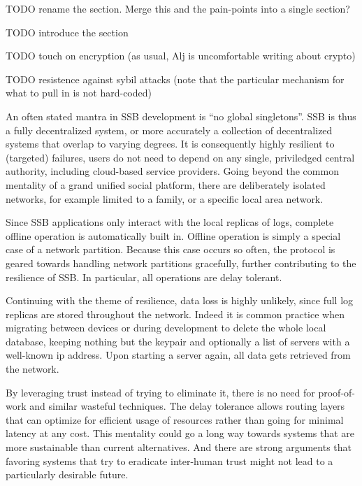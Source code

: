 \documentclass[sigconf]{acmart}
\begin{document}
TODO rename the section. Merge this and the pain-points into a single section?

TODO introduce the section

TODO touch on encryption (as usual, Alj is uncomfortable writing about crypto)

TODO resistence against sybil attacks (note that the particular mechanism for what to pull in is not hard-coded)

An often stated mantra in SSB development is ``no global singletons''. SSB is thus a fully decentralized system, or more accurately a collection of decentralized systems that overlap to varying degrees. It is consequently highly resilient to (targeted) failures, users do not need to depend on any single, priviledged central authority, including cloud-based service providers. Going beyond the common mentality of a grand unified social platform, there are deliberately isolated networks, for example limited to a family, or a specific local area network.

Since SSB applications only interact with the local replicas of logs, complete offline operation is automatically built in. Offline operation is simply a special case of a network partition. Because this case occurs so often, the protocol is geared towards handling network partitions gracefully, further contributing to the resilience of SSB. In particular, all operations are delay tolerant.

Continuing with the theme of resilience, data loss is highly unlikely, since full log replicas are stored throughout the network. Indeed it is common practice when migrating between devices or during development to delete the whole local database, keeping nothing but the keypair and optionally a list of servers with a well-known ip address. Upon starting a server again, all data gets retrieved from the network.


By leveraging trust instead of trying to eliminate it, there is no need for proof-of-work and similar wasteful techniques. The delay tolerance allows routing layers that can optimize for efficient usage of resources rather than going for minimal latency at any cost. This mentality could go a long way towards systems that are more sustainable than current alternatives. And there are strong arguments that favoring systems that try to eradicate inter-human trust might not lead to a particularly desirable future.
\end{document}
